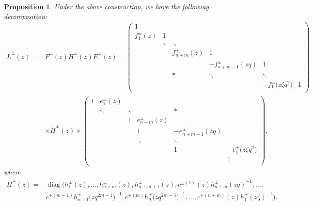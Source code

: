 \documentclass[10pt,a4paper]{amsart}
\numberwithin{equation}{section}
\newtheorem{Proposition}[Theorem]{Proposition}
 { \theoremstyle{definition}
\newtheorem{Definition}[Theorem]{Definition}
\newtheorem{Note}[Theorem]{Note}
\newtheorem{Example}[Theorem]{Example}
\newtheorem{Remark}[Theorem]{Remark} }
\begin{document}
\begin{Proposition}\label{FHE}
Under the above construction, we have the following decomposition:
\begin{align*}
 \dot{L}^{\pm}(z)={}&\dot{F}^{\pm}(z)\dot{H}^{\pm}(z)\dot{E}^{\pm}(z)=\left(
 \begin{matrix}
 1 & & & & & \\
 f_1^{\pm}(z) & 1 & & & & \\
 & \ddots & \ddots & & & \\
 & & f_{n+m}^{\pm}(z) & 1 & & \\
 & & & -f_{n+m-1}^{\pm}(zq) &1 & \\
 & & * & \ddots& \ddots & \\
 & & & & -f_{1}^{\pm}\bigl(z\zeta q^2\bigr) & 1 \\
 \end{matrix}
 \right)\\
 & \times \dot{H}^{\pm}(z)\times
 \left(
 \begin{matrix}
 1 & e_1^{\pm}(z) & & & & \\
 & \ddots & \ddots & & * & \\
 & & 1 & e_{n+m}^{\pm}(z) & & \\
 & & & 1 & -e_{n+m-1}^{\pm}(zq) & \\
 & & & \ddots & \ddots & \\
 & & & & 1 & -e_{1}^{\pm}\bigl(z\zeta q^2\bigr) \\
 & & & & & 1\\
 \end{matrix}
 \right),
\end{align*}
where
 \begin{align*}
\dot{H}^{\pm}(z)={}&\operatorname{diag}\bigl(h_1^{\pm}(z), \dots, h_{n+m}^{\pm}(z), h_{n+m+1}^{\pm}(z), c^{\pm(1)}(z)h_{n+m}^{\pm}(zq)^{-1} ,\dots,\\
& c^{\pm ( m-1)}h_{n+1}^{\pm}\bigl(zq^{2m-1}\bigr)^{-1},
c^{\pm( m)}h_{n}^{\pm}\bigl(zq^{2m-3}\bigr)^{-1},\dots,
c^{\pm(n+m)}(z)h_{1}^{\pm}(z\zeta)^{-1}\bigr).
\end{align*}
\end{Proposition}
\end{document}
